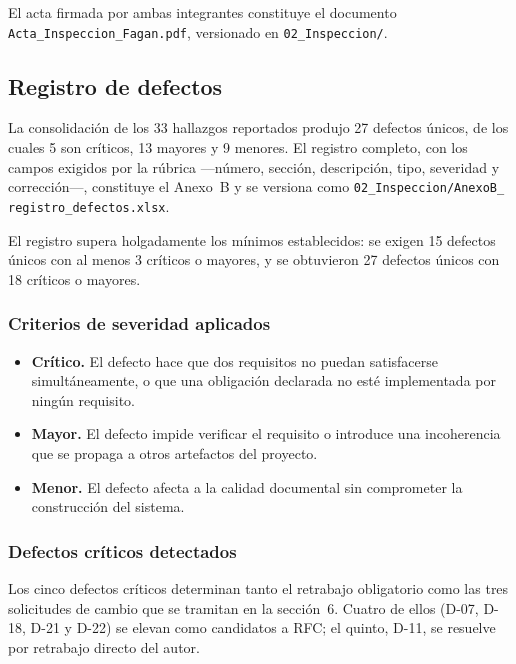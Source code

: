 \documentclass[journal,onecolumn]{IEEEtran}
\begin{document}
	El acta firmada por ambas integrantes constituye el documento
	\texttt{Acta\_Inspeccion\_Fagan.pdf}, versionado en \texttt{02\_Inspeccion/}.
	
	\subsection{Registro de defectos}
	
	La consolidación de los 33 hallazgos reportados produjo 27 defectos únicos,
	de los cuales 5 son críticos, 13 mayores y 9 menores. El registro completo,
	con los campos exigidos por la rúbrica —número, sección, descripción, tipo,
	severidad y corrección—, constituye el Anexo~B y se versiona como
	\texttt{02\_\allowbreak Inspeccion/\allowbreak AnexoB\_\allowbreak
		registro\_\allowbreak defectos.xlsx}.
	
	El registro supera holgadamente los mínimos establecidos: se exigen 15
	defectos únicos con al menos 3 críticos o mayores, y se obtuvieron 27
	defectos únicos con 18 críticos o mayores.
	
	\subsubsection{Criterios de severidad aplicados}
	
	\begin{itemize}
		\item \textbf{Crítico.} El defecto hace que dos requisitos no puedan
		satisfacerse simultáneamente, o que una obligación declarada no esté
		implementada por ningún requisito.
		
		\item \textbf{Mayor.} El defecto impide verificar el requisito o
		introduce una incoherencia que se propaga a otros artefactos del
		proyecto.
		
		\item \textbf{Menor.} El defecto afecta a la calidad documental sin
		comprometer la construcción del sistema.
	\end{itemize}
	
	\subsubsection{Defectos críticos detectados}
	
	Los cinco defectos críticos determinan tanto el retrabajo obligatorio como
	las tres solicitudes de cambio que se tramitan en la sección~6. Cuatro de
	ellos (D-07, D-18, D-21 y D-22) se elevan como candidatos a RFC; el quinto,
	D-11, se resuelve por retrabajo directo del autor.
	
\end{document}
